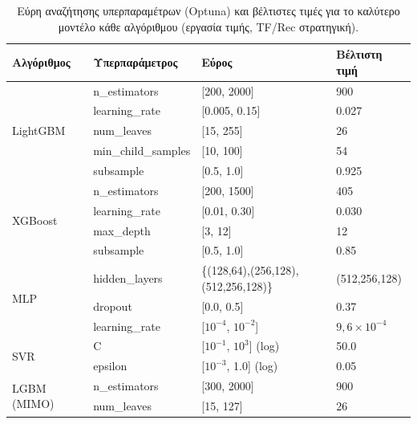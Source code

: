 \begin{table}[H]
\centering
\small
\caption{Εύρη αναζήτησης υπερπαραμέτρων (Optuna) και βέλτιστες τιμές για το καλύτερο
μοντέλο κάθε αλγόριθμου (εργασία τιμής, TF/Rec στρατηγική).}
\label{tab:optuna_params}
\begin{tabular}{llll}
\toprule
Αλγόριθμος & Υπερπαράμετρος & Εύρος & Βέλτιστη τιμή \\
\midrule
\multirow{5}{*}{LightGBM}
  & n\_estimators      & [200, 2000]               & 900   \\
  & learning\_rate     & [0.005, 0.15]             & 0.027 \\
  & num\_leaves        & [15, 255]                 & 26    \\
  & min\_child\_samples & [10, 100]                & 54    \\
  & subsample          & [0.5, 1.0]                & 0.925 \\
\midrule
\multirow{4}{*}{XGBoost}
  & n\_estimators      & [200, 1500]               & 405   \\
  & learning\_rate     & [0.01, 0.30]              & 0.030 \\
  & max\_depth         & [3, 12]                   & 12    \\
  & subsample          & [0.5, 1.0]                & 0.85  \\
\midrule
\multirow{3}{*}{MLP}
  & hidden\_layers     & \{(128,64),(256,128),(512,256,128)\} & (512,256,128) \\
  & dropout            & [0.0, 0.5]                & 0.37  \\
  & learning\_rate     & [$10^{-4}$, $10^{-2}$]   & $9{,}6 \times 10^{-4}$ \\
\midrule
\multirow{2}{*}{SVR}
  & C                  & [$10^{-1}$, $10^3$] (log) & 50.0  \\
  & epsilon            & [$10^{-3}$, 1.0] (log)    & 0.05  \\
\midrule
\multirow{2}{*}{LGBM (MIMO)}
  & n\_estimators      & [300, 2000]               & 900   \\
  & num\_leaves        & [15, 127]                 & 26    \\
\bottomrule
\end{tabular}
\end{table}


